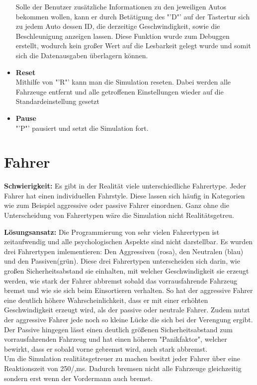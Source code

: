 \begin{addmargin}[25pt]{0pt}
\begin{itemize}
		Solle der Benutzer zusätzliche Informationen zu den jeweiligen Autos bekommen wollen, kann er durch Betätigung des "'D"' auf der Tastertur sich zu jedem Auto dessen ID, die derzeitige Geschwindigkeit, sowie die Beschleunigung anzeigen lassen. Diese Funktion wurde zum Debuggen erstellt, wodurch kein großer Wert auf die Lesbarkeit gelegt wurde und somit sich die Datenausgaben überlagern können.
		\item \textbf{Reset}\\
		Mithilfe von "'R"' kann man die Simulation reseten. Dabei werden alle Fahrzeuge entfernt und alle getroffenen Einstellungen wieder auf die Standardeinstellung gesetzt
		\item \textbf{Pause}\\
		"'P"' pausiert und setzt die Simulation fort.
	\end{itemize}
\end{addmargin}

\section{Fahrer}
\textbf{Schwierigkeit:} Es gibt in der Realität viele unterschiedliche Fahrertype. Jeder Fahrer hat einen individuellen Fahrstyle. Diese lassen sich häufig in Kategorien wie zum Beispiel aggressive oder passive Fahrer einordnen. Ganz ohne die Unterscheidung von Fahrertypen wäre die Simulation nicht Realitätsgetreu.
\begin{addmargin}[25pt]{0pt}
	\item \textbf{Lösungsansatz:} Die Programmierung von sehr vielen Fahrertypen ist zeitaufwendig und alle psychologischen Aspekte sind nicht darstellbar. Es wurden drei Fahrertypen imlementieren: Den Aggressiven (rosa), den Neutralen (blau) und den Passiven(grün). Diese drei Fahrertypen unterscheiden sich darin, wie großen Sicherheitsabstand sie einhalten, mit welcher Geschwindigkeit sie erzeugt werden, wie stark der Fahrer abbremst sobald das vorrausfahrende Fahrzeug bremst und wie sie sich beim Einsortieren verhalten. So hat der aggressive Fahrer eine deutlich höhere Wahrscheinlichkeit, dass er mit einer erhöhten Geschwindigkeit erzeugt wird, als der passive oder neutrale Fahrer. Zudem nutzt der aggressive Fahrer jede noch so kleine Lücke die sich bei der Verengung ergibt. Der Passive hingegen lässt einen deutlich größenen Sicherheitsabstand zum vorrausfahrenden Fahrzeug und hat einen höheren "Panikfaktor", welcher bewirkt, dass er sobald vorne gebremst wird, auch stark abbremst.\\
	Um die Simulation realitätsgetreuer zu machen besitzt jeder Fahrer über eine Reaktionszeit von 250/,ms. Dadurch bremsen nicht alle Fahrzeuge gleichzeitig sondern erst wenn der Vordermann auch bremst.\\
\end{addmargin}
